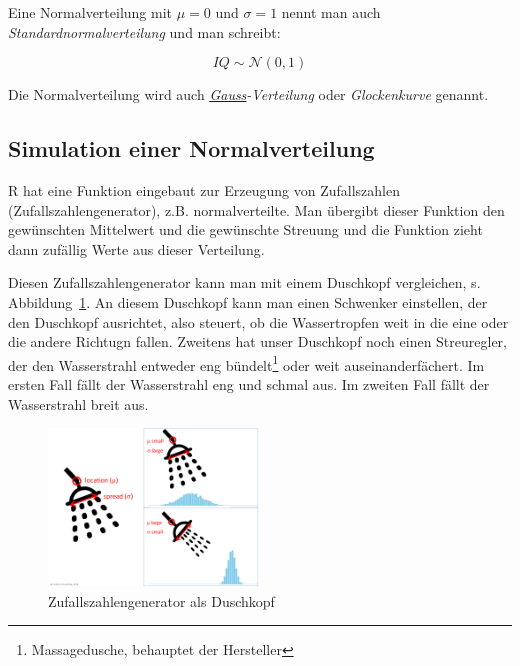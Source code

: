\documentclass[
  a4paper,
  DIV=11]{scrreprt}
\theoremstyle{definition}
\theoremstyle{remark}
\begin{document}
Eine Normalverteilung mit \(\mu=0\) und \(\sigma=1\) nennt man auch
\emph{Standardnormalverteilung} und man schreibt:

\[IQ \sim \mathcal{N}(0,1)\]

Die Normalverteilung wird auch
\emph{\href{https://de.wikipedia.org/wiki/Carl_Friedrich_Gau\%C3\%9F}{Gauss}-Verteilung}
oder \emph{Glockenkurve} genannt.

\hypertarget{simulation-einer-normalverteilung}{%
\subsection{Simulation einer
Normalverteilung}\label{simulation-einer-normalverteilung}}

R hat eine Funktion eingebaut zur Erzeugung von Zufallszahlen
(Zufallszahlengenerator), z.B. normalverteilte. Man übergibt dieser
Funktion den gewünschten Mittelwert und die gewünschte Streuung und die
Funktion zieht dann zufällig Werte aus dieser Verteilung.

Diesen Zufallszahlengenerator kann man mit einem Duschkopf vergleichen,
s. Abbildung~\ref{fig-shower}. An diesem Duschkopf kann man einen
Schwenker einstellen, der den Duschkopf ausrichtet, also steuert, ob die
Wassertropfen weit in die eine oder die andere Richtugn fallen. Zweitens
hat unser Duschkopf noch einen Streuregler, der den Wasserstrahl
entweder eng bündelt\footnote{Massagedusche, behauptet der Hersteller}
oder weit auseinanderfächert. Im ersten Fall fällt der Wasserstrahl eng
und schmal aus. Im zweiten Fall fällt der Wasserstrahl breit aus.

\begin{figure}

{\centering \includegraphics[width=0.5\textwidth,height=\textheight]{./img/shower-data.png}

}

\caption{\label{fig-shower}Zufallszahlengenerator als Duschkopf}

\end{figure}
\end{document}
